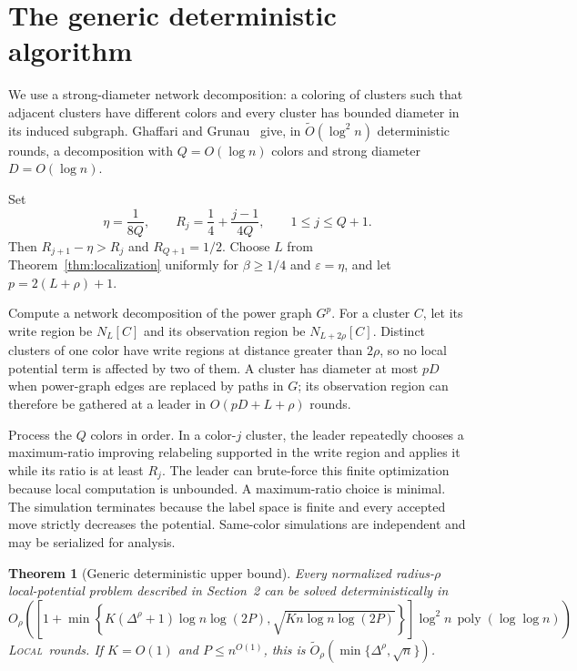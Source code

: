 \documentclass[11pt]{article}
\newtheorem{theorem}{Theorem}[section]
\theoremstyle{definition}
\theoremstyle{remark}
\newcommand{\poly}{\operatorname{poly}}
\newcommand{\eps}{\varepsilon}
\newcommand{\N}{N}
\newcommand{\LOCAL}{\textnormal{\textsc{Local}}}
\begin{document}
\section{The generic deterministic algorithm}

We use a strong-diameter network decomposition: a coloring of clusters such that
adjacent clusters have different colors and every cluster has bounded diameter in
its induced subgraph.  Ghaffari and Grunau~\cite{GhaffariGrunau2024} give, in
$\widetilde O(\log^2 n)$ deterministic rounds, a decomposition with
$Q=O(\log n)$ colors and strong diameter $D=O(\log n)$.

Set
\[
 \eta=\frac1{8Q},
 \qquad
 R_j=\frac14+\frac{j-1}{4Q},
 \qquad 1\leq j\leq Q+1.
\]
Then $R_{j+1}-\eta>R_j$ and $R_{Q+1}=1/2$.  Choose $L$ from
Theorem~\ref{thm:localization} uniformly for $\beta\geq1/4$ and $\eps=\eta$, and let
$p=2(L+\rho)+1$.

Compute a network decomposition of the power graph $G^p$.  For a cluster $C$, let
its write region be $\N_L[C]$ and its observation region be $\N_{L+2\rho}[C]$.
Distinct clusters of one color have write regions at distance greater than $2\rho$,
so no local potential term is affected by two of them.  A cluster has diameter at
most $pD$ when power-graph edges are replaced by paths in $G$; its observation region
can therefore be gathered at a leader in $O(pD+L+\rho)$ rounds.

Process the $Q$ colors in order.  In a color-$j$ cluster, the leader repeatedly
chooses a maximum-ratio improving relabeling supported in the write region and
applies it while its ratio is at least $R_j$.  The leader can brute-force this finite
optimization because local computation is unbounded.  A maximum-ratio choice is
minimal.  The simulation terminates because the label space is finite and every
accepted move strictly decreases the potential.  Same-color simulations are
independent and may be serialized for analysis.

\begin{theorem}[Generic deterministic upper bound]\label{thm:generic}
Every normalized radius-$\rho$ local-potential problem described in
Section~2 can be solved deterministically in
\begin{equation}\label{eq:generic-bound}
 O_\rho\!\left(
 \left[1+\min\left\{
 K(\Delta^\rho+1)\log n\log(2P),
 \sqrt{Kn\log n\log(2P)}
 \right\}\right]
 \log^2 n\,\poly(\log\log n)
 \right)
\end{equation}
\LOCAL\ rounds.  If $K=O(1)$ and $P\leq n^{O(1)}$, this is
$\widetilde O_\rho(\min\{\Delta^\rho,\sqrt n\})$.
\end{theorem}
\end{document}
